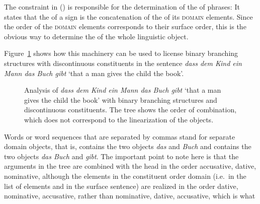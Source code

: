\documentclass[output=paper,biblatex,babelshorthands,newtxmath,draftmode,colorlinks,citecolor=brown]{langscibook}
\begin{document}
The constraint in () is responsible for the determination of the \phonvs of phrases:
\ea
{} \impl
{}
\z
It states that the \phonv of a sign is the concatenation of the \phonvs of its \textsc{domain}
elements. Since the order of the \textsc{domain} elements corresponds to their surface order, this is
the obvious way to determine the \phonv of the whole linguistic object. 

Figure~\ref{fig-the-child-reads-the-book-reape-binary} shows how this machinery can be used to license binary
branching structures with discontinuous constituents in the sentence
\emph{dass dem Kind ein Mann das Buch gibt} `that a man gives the
child the book'.
\begin{figure}
\caption{\label{fig-the-child-reads-the-book-reape-binary}Analysis of \emph{dass dem Kind ein Mann das Buch
    gibt} `that a man gives the child the book' with binary branching structures and discontinuous
  constituents. The tree shows the order of combination, which does not correspond to the
  linearization of the \domain objects.}
\end{figure}%
Words or word sequences that are separated by commas stand for separate domain objects, that is,
 contains the two objects \emph{das} and \emph{Buch} and  contains the two objects \emph{das Buch} and \emph{gibt}.
The important point to note here is that the
arguments in the tree are combined with the head in the order
accusative, dative, nominative, although the elements in the
constituent order domain (i.e.\ in the list of \domain elements and in
the surface sentence) are realized in the order dative, nominative,
accusative, rather than nominative, dative, accusative, which is what
\end{document}
